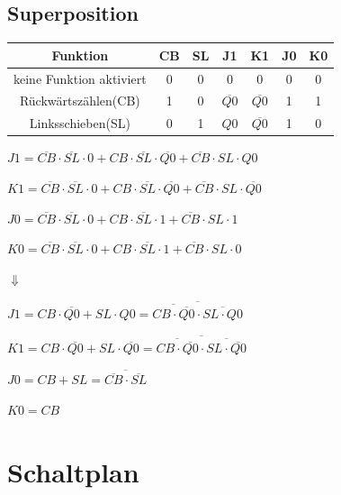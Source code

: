 \documentclass[fleqn]{article}
\begin{document}
\subsection{Superposition}

\begin{center}
    \begin{tabular}{c|cc|cc|cc}
        Funktion&CB&SL&J1&K1&J0&K0\\
        \hline
        keine Funktion aktiviert&0&0&0&0&0&0\\
        \hline
        Rückwärtszählen(CB)&1&0&$\overline{Q0}$&$\overline{Q0}$&1&1\\
        \hline
        Linksschieben(SL)&0&1&$Q0$&$\overline{Q0}$&1&0
    \end{tabular}
\end{center}

$J1=\overline{CB}\cdot\overline{SL}\cdot 0 + CB\cdot\overline{SL}\cdot\overline{Q0} + \overline{CB}\cdot SL\cdot Q0$

$K1=\overline{CB}\cdot\overline{SL}\cdot 0 + CB\cdot\overline{SL}\cdot\overline{Q0} + \overline{CB}\cdot SL\cdot \overline{Q0}$

$J0=\overline{CB}\cdot\overline{SL}\cdot 0 + CB\cdot\overline{SL}\cdot1 + \overline{CB}\cdot SL\cdot 1$

$K0=\overline{CB}\cdot\overline{SL}\cdot 0 + CB\cdot\overline{SL}\cdot1 + \overline{CB}\cdot SL\cdot 0$

\qquad $\Downarrow$

$J1=CB\cdot\overline{Q0}+SL\cdot Q0 = \overline{\overline{CB\cdot\overline{Q0}}\cdot\overline{SL\cdot Q0}}$

$K1=CB\cdot\overline{Q0}+SL\cdot\overline{Q0} = \overline{\overline{CB\cdot \overline{Q0}}\cdot\overline{SL\cdot\overline{Q0}}}$

$J0=CB+SL = \overline{\overline{CB}\cdot\overline{SL}}$

$K0=CB$

\section{Schaltplan}
\end{document}
